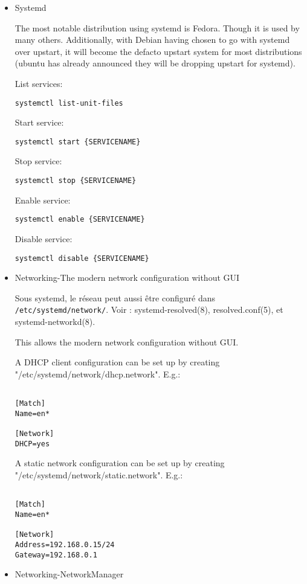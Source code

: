 \begin{itemize}
\item Systemd

The most notable distribution using systemd is Fedora. Though it is used by many others. Additionally, with Debian having chosen to go with systemd over upstart, it will become the defacto upstart system for most distributions (ubuntu has already announced they will be dropping upstart for systemd).

List services:
\begin{lstlisting}[basicstyle=\small\ttfamily,columns=flexible,breaklines=true]
systemctl list-unit-files
\end{lstlisting}

Start service:
\begin{lstlisting}[basicstyle=\small\ttfamily,columns=flexible,breaklines=true]
systemctl start {SERVICENAME}
\end{lstlisting}

Stop service:
\begin{lstlisting}[basicstyle=\small\ttfamily,columns=flexible,breaklines=true]
systemctl stop {SERVICENAME}
\end{lstlisting}

Enable service:
\begin{lstlisting}[basicstyle=\small\ttfamily,columns=flexible,breaklines=true]
systemctl enable {SERVICENAME}
\end{lstlisting}

Disable service:
\begin{lstlisting}[basicstyle=\small\ttfamily,columns=flexible,breaklines=true]
systemctl disable {SERVICENAME}
\end{lstlisting}

\item Networking-The modern network configuration without GUI

Sous systemd, le réseau peut aussi être configuré dans \verb=/etc/systemd/network/=. Voir : systemd-resolved(8), resolved.conf(5), et systemd-networkd(8).

This allows the modern network configuration without GUI.

A DHCP client configuration can be set up by creating "/etc/systemd/network/dhcp.network". E.g.:
\begin{lstlisting}[basicstyle=\small\ttfamily,columns=flexible,breaklines=true]

[Match]
Name=en*

[Network]
DHCP=yes
\end{lstlisting}

A static network configuration can be set up by creating "/etc/systemd/network/static.network". E.g.:
\begin{lstlisting}[basicstyle=\small\ttfamily,columns=flexible,breaklines=true]

[Match]
Name=en*

[Network]
Address=192.168.0.15/24
Gateway=192.168.0.1
\end{lstlisting}

\item Networking-NetworkManager

\end{itemize}

